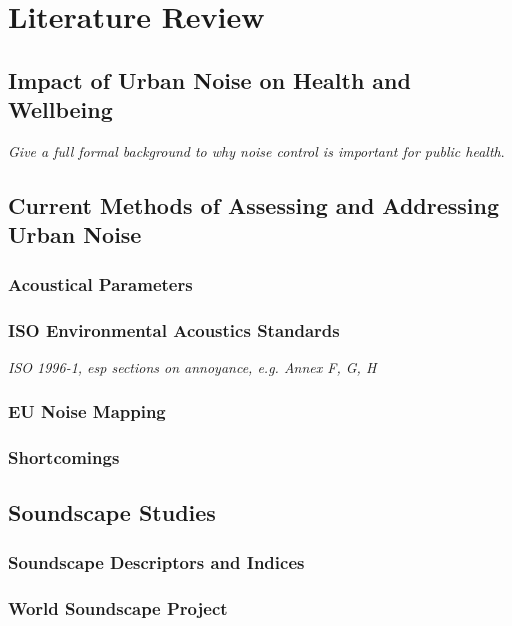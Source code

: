 \chapter{Literature Review}
\label{ch:lit}

\section{Impact of Urban Noise on Health and Wellbeing}

  \emph{Give a full formal background to why noise control is important for public health}.

\section{Current Methods of Assessing and Addressing Urban Noise}

  \subsection{Acoustical Parameters}

  \subsection{ISO Environmental Acoustics Standards}
    \emph{ISO 1996-1, esp sections on annoyance, e.g. Annex F, G, H}

  \subsection{EU Noise Mapping}

  \subsection{Shortcomings}

\section{Soundscape Studies}

  \subsection{Soundscape Descriptors and Indices}

  \subsection{World Soundscape Project}

